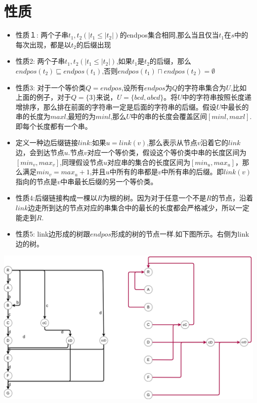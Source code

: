 \documentclass{article}
\begin{document}
\section{性质}
\begin{itemize}
	\item 性质１: 两个子串$t_{1},t_{2}(|t_{1} \leq |t_{2}|)$的endpos集合相同,那么当且仅当$t_{1}$在$s$中的每次出现，都是以$t_{2}$的后缀出现
	\item 性质2: 两个子串$t_{1},t_{2}(|t_{1} \leq |t_{2}|)$,如果$t_{1}$是$t_{2}$的后缀，那么$endpos(t_{2}) \sqsubseteq endpos(t_{1})$,否则$endpos(t_{1})\sqcap endpos(t_{2})= \emptyset$
	\item 性质3: 对于一个等价类$Q=endpos$,设所有$endpos$为$Q$的字符串集合为$U$,比如上面的例子，对于$Q=\{3\}$来说，$U=\{bcd,abcd\}$。将$U$中的字符串按照长度递增排序，那么排在前面的字符串一定是后面的字符串的后缀。假设$U$中最长的串的长度为$maxl$,最短的为$minl$,那么$U$中的串的长度会覆盖区间$[minl,maxl]$.即每个长度都有一个串。
	\item 定义一种边后缀链接$link$:如果$u=link(v)$,那么表示从节点$v$沿着它的$link$边，会到达节点$u$.节点$v$对应一个等价类，假设这个等价类中串的长度区间为$[min_{v},max_{v}]$,同理假设节点$u$对应串的集合的长度区间为$[min_{u},max_{u}]$，那么满足$min_{v}=max_{u}+1$,并且$u$中所有的串都是$v$中所有串的后缀。即$link(v)$指向的节点是$v$中串最长后缀的另一个等价类。
	\item 性质4:后缀链接构成一棵以$R$为根的树。因为对于任意一个不是$R$的节点，沿着$link$边走所到达的节点对应的串集合中的最长的长度都会严格减少，所以一定能走到$R$.
	\item 性质5: link边形成的树跟$endpos$形成的树的节点一样.如下图所示。右侧为link边的树。
\end{itemize}
\includegraphics[scale=0.25]{pic2.png} \par
\end{document}
